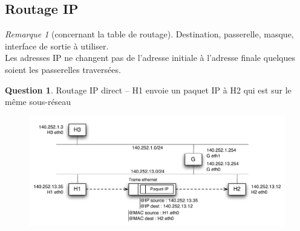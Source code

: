 \documentclass[11pt,english,french]{scrreprt}
\theoremstyle{remark}
\newtheorem*{rem*}{Remarque}
\theoremstyle{definition}
\newtheorem{ques*}{Question}[subsection]
\begin{document}
\subsection{Routage IP}
\begin{rem*}[concernant la table de routage]
	Destination, passerelle, masque, interface de sortie à utiliser.\\
	Les adresses IP ne changent pas de l'adresse initiale à l'adresse finale quelques soient les passerelles traversées.
\end{rem*} 

\begin{ques*}
	Routage IP direct -- H1 envoie un paquet IP à H2 qui est sur le même sous-réseau
	\begin{figure}[h!]
		\center
		\includegraphics[scale=.8]{graphes/Routage-IP-direct}
	\end{figure}
\end{ques*}
\end{document}
